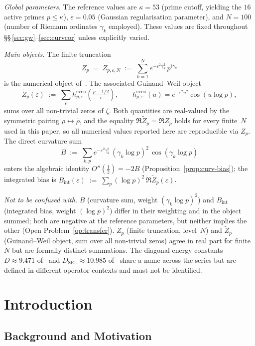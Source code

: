 \documentclass[11pt]{article}
\newcommand{\Zt}{\widetilde{Z}}
\newcommand{\DSEL}{D_{\mathrm{SEL}}}
\begin{document}
\medskip
\emph{Global parameters.}
The reference values are $\kappa=53$ (prime cutoff, yielding the
$16$ active primes $p\le\kappa$), $\varepsilon=0.05$ (Gaussian
regularisation parameter), and $N=100$ (number of Riemann ordinates
$\gamma_k$ employed).
These values are fixed throughout
\S\S\,\ref{sec:gw}--\ref{sec:curvcor} unless explicitly varied.

\medskip
\emph{Main objects.}
The finite truncation
\[
Z_p \;=\; Z_{p,\varepsilon,N} \;:=\;
\sum_{k=1}^{N} e^{-\varepsilon^2\gamma_k^2}\,p^{i\gamma_k}
\]
is the numerical object of~\cite{Paper4,Paper5}.
The associated Guinand--Weil object
\[
\Zt_p(\varepsilon) \;:=\; \sum_{\rho}
h^{\mathrm{even}}_{p,\varepsilon}\!\left(\tfrac{\rho-1/2}{i}\right),
\qquad
h^{\mathrm{even}}_{p,\varepsilon}(u)=e^{-\varepsilon^2 u^2}\cos(u\log p),
\]
sums over all non-trivial zeros of $\zeta$.
Both quantities are real-valued by the symmetric pairing
$\rho\leftrightarrow\bar\rho$, and the equality
$\Re\Zt_p=\Re Z_p$ holds for every finite~$N$ used in this paper, so
all numerical values reported here are reproducible via $Z_p$.
The direct curvature sum
\[
B \;:=\; \sum_{k,p} e^{-\varepsilon^2\gamma_k^2}\,
(\gamma_k\log p)^2\,\cos(\gamma_k\log p)
\]
enters the algebraic identity $O''(\tfrac12)=-2B$
(Proposition~\ref{prop:curv-bias}); the integrated bias is
$B_{\mathrm{int}}(\varepsilon)\;:=\;\sum_p (\log p)^2\,\Re\Zt_p(\varepsilon)$.

\medskip
\emph{Not to be confused with.}
$B$ (curvature sum, weight $(\gamma_k\log p)^2$) and $B_{\mathrm{int}}$
(integrated bias, weight $(\log p)^2$) differ in their weighting and
in the object summed; both are negative at the reference parameters,
but neither implies the other (Open Problem~\ref{op:transfer}).
$Z_p$ (finite truncation, level~$N$) and $\Zt_p$ (Guinand--Weil object,
sum over all non-trivial zeros) agree in real part for finite $N$ but
are formally distinct summations.
The diagonal-energy constants $D\approx 9.471$ of~\cite{Paper2} and
$\DSEL\approx 10.985$ of~\cite{Paper5} share a name across the series
but are defined in different operator contexts and must not be
identified.

\newpage

\section{Introduction}
\label{sec:intro}

\subsection{Background and Motivation}
\end{document}
